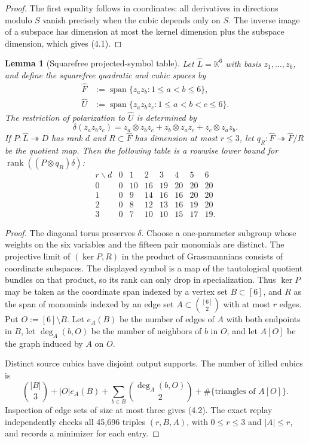 \documentclass[11pt]{amsart}
\newcommand{\K}{\mathbb{K}}
\newcommand{\Span}{\operatorname{span}}
\newcommand{\rank}{\operatorname{rank}}
\newtheorem{lemma}[theorem]{Lemma}
\theoremstyle{definition}
\begin{document}
\begin{proof}
The first equality follows in coordinates: all derivatives in directions
modulo \(S\) vanish precisely when the cubic depends only on \(S\). The
inverse image of a subspace has dimension at most the kernel dimension plus
the subspace dimension, which gives (4.1).
\end{proof}

\begin{lemma}[Squarefree projected-symbol table]\label{lem:squarefree}
Let \(\widehat L=\K^6\) with basis \(z_1,\ldots,z_6\), and define the
squarefree quadratic and cubic spaces by
\[
 \begin{aligned}
 \widehat F&:=\Span\{z_az_b:1\le a<b\le6\},\\
 \widehat U&:=\Span\{z_az_bz_c:1\le a<b<c\le6\}.
 \end{aligned}
\]
The restriction of polarization to \(\widehat U\) is determined by
\[
 \delta(z_az_bz_c)=z_a\otimes z_bz_c+z_b\otimes z_az_c
                    +z_c\otimes z_az_b.
\]
If \(P:\widehat L\twoheadrightarrow D\) has rank \(d\) and
\(R\subset\widehat F\) has dimension at most \(r\le3\), let
\(q_R:\widehat F\twoheadrightarrow\widehat F/R\) be the quotient map. Then the following
table is a rowwise lower bound for
\(\rank((P\otimes q_R)\delta)\):
\[
\begin{array}{c|rrrrrrr}
r\backslash d&0&1&2&3&4&5&6\\ \hline
0&0&10&16&19&20&20&20\\
1&0&9&14&16&16&20&20\\
2&0&8&12&13&16&19&20\\
3&0&7&10&10&15&17&19.
\end{array} \tag{4.2}
\]
\end{lemma}

\begin{proof}
The diagonal torus preserves \(\delta\). Choose a one-parameter subgroup
whose weights on the six variables and the fifteen pair monomials are
distinct. The projective limit of \((\ker P,R)\) in the product of
Grassmannians consists of coordinate subspaces. The displayed symbol is
a map of the tautological quotient bundles on that product, so its rank
can only drop in specialization. Thus \(\ker P\) may be
taken as the coordinate span indexed by a vertex set \(B\subset[6]\), and
\(R\) as the span of monomials indexed by an edge set
\(A\subset\binom{[6]}2\) with at most \(r\) edges. Put
\(O:=[6]\setminus B\). Let \(e_A(B)\) be the number of edges of \(A\) with
both endpoints in \(B\), let \(\deg_A(b,O)\) be the number of neighbors of
\(b\) in \(O\), and let \(A[O]\) be the graph induced by \(A\) on \(O\).

Distinct source cubics have disjoint output supports. The number of killed
cubics is
\[
 \binom{|B|}{3}+|O|e_A(B)
 +\sum_{b\in B}\binom{\deg_A(b,O)}2
 +\#\{\text{triangles of }A[O]\}. \tag{4.3}
\]
Inspection of edge sets of size at most three gives (4.2). The exact replay
independently checks all 45,696 triples \((r,B,A)\), with \(0\le r\le3\)
and \(|A|\le r\), and records a minimizer for each entry.
\end{proof}
\end{document}
